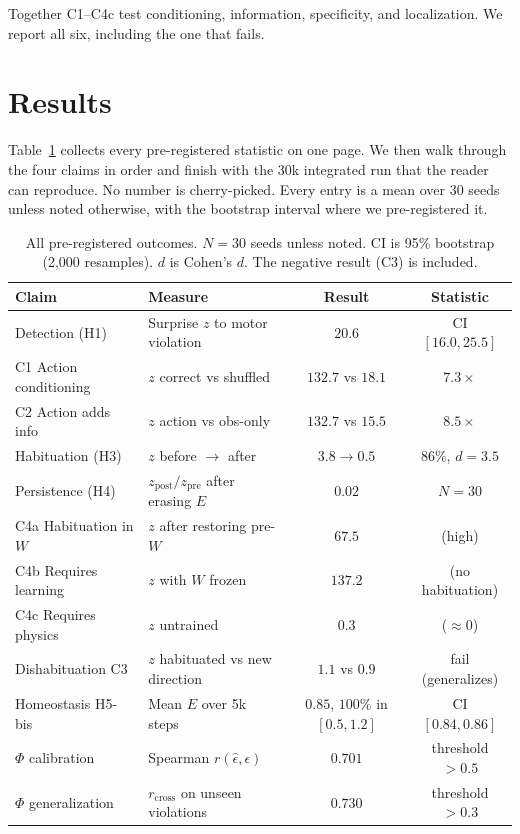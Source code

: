 \documentclass[11pt,a4paper]{article}
\begin{document}
Together C1--C4c test conditioning, information, specificity, and localization. We report all six, including the one that fails.

\section{Results}
\label{sec:results}

Table~\ref{tab:main} collects every pre-registered statistic on one page. We then walk through the four claims in order and finish with the 30k integrated run that the reader can reproduce. No number is cherry-picked. Every entry is a mean over 30 seeds unless noted otherwise, with the bootstrap interval where we pre-registered it.

\begin{table}[h]
\centering
\caption{All pre-registered outcomes. $N=30$ seeds unless noted. CI is 95\% bootstrap (2,000 resamples). $d$ is Cohen's $d$. The negative result (C3) is included.}
\label{tab:main}
\begin{tabular}{@{}llcc@{}}
\toprule
Claim & Measure & Result & Statistic \\
\midrule
Detection (H1) & Surprise $z$ to motor violation & $20.6$ & CI $[16.0, 25.5]$ \\
C1 Action conditioning & $z$ correct vs shuffled & $132.7$ vs $18.1$ & $7.3\times$ \\
C2 Action adds info & $z$ action vs obs-only & $132.7$ vs $15.5$ & $8.5\times$ \\
Habituation (H3) & $z$ before $\rightarrow$ after & $3.8 \rightarrow 0.5$ & $86\%$, $d=3.5$ \\
Persistence (H4) & $z_{\mathrm{post}}/z_{\mathrm{pre}}$ after erasing $E$ & $0.02$ & $N=30$ \\
C4a Habituation in $W$ & $z$ after restoring pre-$W$ & $67.5$ & (high) \\
C4b Requires learning & $z$ with $W$ frozen & $137.2$ & (no habituation) \\
C4c Requires physics & $z$ untrained & $0.3$ & ($\approx 0$) \\
Dishabituation C3 & $z$ habituated vs new direction & $1.1$ vs $0.9$ & fail (generalizes) \\
Homeostasis H5-bis & Mean $E$ over 5k steps & $0.85$, $100\%$ in $[0.5,1.2]$ & CI $[0.84, 0.86]$ \\
$\Phi$ calibration & Spearman $r(\hat\epsilon,\epsilon)$ & $0.701$ & threshold $>0.5$ \\
$\Phi$ generalization & $r_{\mathrm{cross}}$ on unseen violations & $0.730$ & threshold $>0.3$ \\

\end{tabular}
\end{table}
\end{document}
